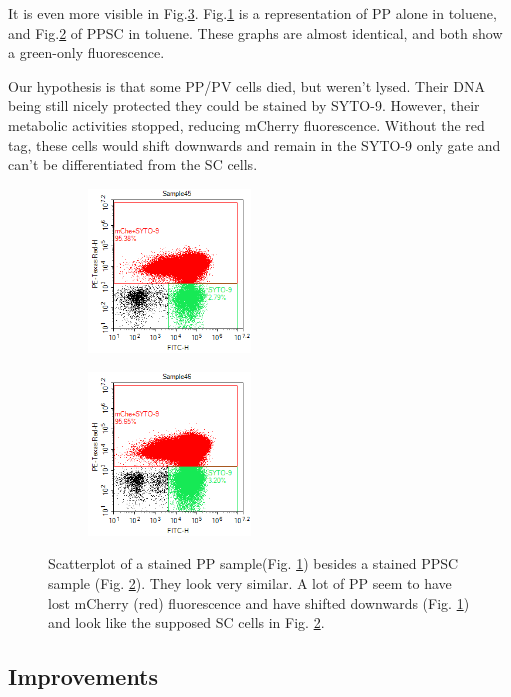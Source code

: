 \documentclass[a4paper, 10pt, conference]{ieeeconf}   %
\begin{document}
It is even more visible in Fig.\ref{problemflow}. Fig.\ref{problemflow1} is a representation of PP alone in toluene, and Fig.\ref{problemflow2} of PPSC in toluene. These graphs are almost identical, and both show a green-only fluorescence.
 

Our hypothesis is that some PP/PV cells died, but weren’t lysed. Their DNA being still nicely protected they could be stained by SYTO-9. However, their metabolic activities stopped, reducing mCherry fluorescence. Without the red tag, these cells would shift downwards and remain in the SYTO-9 only gate and can't be differentiated from the SC cells.
\begin{figure}
	\hspace{-0.3cm}
	\begin{subfigure}{.25\textwidth}
		\centering
		\includegraphics[width=4.3cm]{PP3T5.png}
		\caption{}
		\label{problemflow1}
	\end{subfigure}%
	\begin{subfigure}{.22\textwidth}
		\centering		
		\includegraphics[width=4.3cm]{PPSC1T5.png}
		\caption{}
		\label{problemflow2}				
	\end{subfigure}
\caption{Scatterplot of a stained PP sample(Fig. \ref{problemflow1}) besides a stained PPSC sample (Fig. \ref{problemflow2}). They look very similar. A lot of PP seem to have lost mCherry (red) fluorescence and have shifted downwards (Fig. \ref{problemflow1}) and look like the supposed SC cells in Fig. \ref{problemflow2}.  }
\label{problemflow}
\end{figure}	


\subsection{Improvements}
\end{document}
